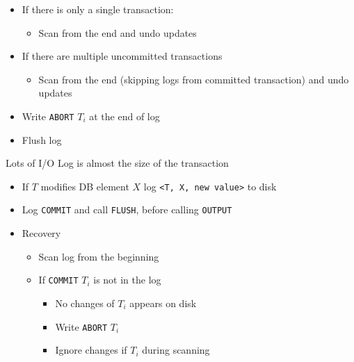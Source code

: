\begin{itemize}
\begin{itemize}
\begin{itemize}
\begin{itemize}
\begin{itemize}
                                    \item If there is only a single transaction:
                                        \begin{itemize}
                                            \item Scan from the end and undo updates
                                        \end{itemize}
                                    \item If there are multiple uncommitted transactions
                                        \begin{itemize}
                                            \item Scan from the end (skipping logs from committed transaction) and undo updates
                                        \end{itemize}
                                    \item Write \verb+ABORT+ $T_i$ at the end of log
                                    \item Flush log
                                \end{itemize}
                        \end{itemize}
                \end{itemize}
            \icon Lots of I/O
            \icon Log is almost the size of the transaction
        \end{itemize}
        \begin{itemize}
            \item If $T$ modifies DB element $X$ log \verb+<T, X, new value>+ to disk
            \item Log \verb+COMMIT+ and call \verb+FLUSH+, before calling \verb+OUTPUT+
            \item Recovery
                \begin{itemize}
                    \item Scan log from the beginning
                    \item If \verb+COMMIT+ $T_i$ is not in the log
                        \begin{itemize}
                            \item No changes of $T_i$ appears on disk
                            \item Write \verb+ABORT+ $T_i$
                            \item Ignore changes if $T_i$ during scanning

\end{itemize}
\end{itemize}
\end{itemize}
\end{itemize}
